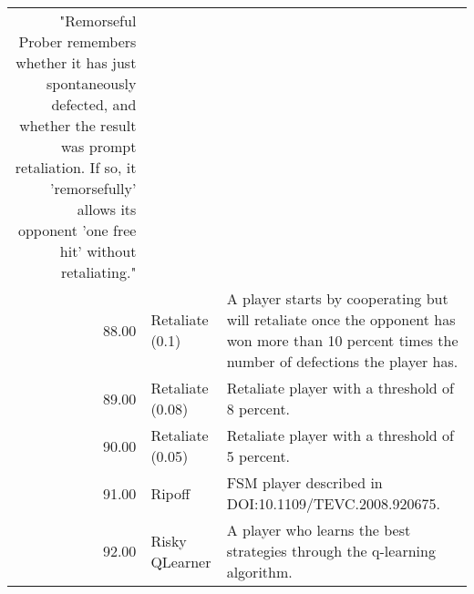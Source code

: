 \begin{tabular}{rll}
	"Remorseful Prober remembers whether it has just spontaneously defected, and
	whether the result was prompt retaliation. If so, it 'remorsefully' allows
	its opponent 'one free hit' without retaliating."                                                                                                                                                                                                                                                \\
	88.00  & Retaliate (0.1)             & A player starts by cooperating but will retaliate once the opponent
	has won more than 10 percent times the number of defections the player has.                                                                                                                                                                                                                                                                                                                                                                                                                                                                                                                                                                                                                                                                                                                                                                                                                                                                      \\
	89.00  & Retaliate (0.08)            & Retaliate player with a threshold of 8 percent.                                                                                   \\
	90.00  & Retaliate (0.05)            & Retaliate player with a threshold of 5 percent.                                                                                   \\
	91.00  & Ripoff                      & FSM player described in DOI:10.1109/TEVC.2008.920675.                                                                             \\
	92.00  & Risky QLearner              & A player who learns the best strategies through the q-learning algorithm.


\end{tabular}
